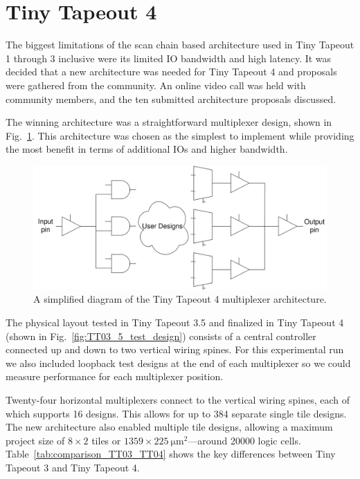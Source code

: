 \section{Tiny Tapeout 4}
\label{sec:tinytapeout4}

The biggest limitations of the scan chain based architecture used in Tiny Tapeout 1 through 3 inclusive were its limited IO bandwidth and high latency.
It was decided that a new architecture was needed for Tiny Tapeout 4 and proposals were gathered from the community.
An online video call was held with community members, and the ten submitted architecture proposals discussed.

The winning architecture was a straightforward multiplexer design, shown in Fig.~\ref{fig:multiplexer_design}. This architecture was chosen as the simplest to implement while providing the most benefit in terms of additional IOs and higher bandwidth.

\begin{figure}[!t]
\centering
\includegraphics[width=\columnwidth]{./Figs/mux architecture.png}
\caption{A simplified diagram of the Tiny Tapeout 4 multiplexer architecture.}
\label{fig:multiplexer_design}
\end{figure}

The physical layout tested in Tiny Tapeout 3.5 and finalized in Tiny Tapeout 4 (shown in Fig.~\ref{fig:TT03_5_test_design}) consists of a central controller connected up and down to two vertical wiring spines.
For this experimental run we also included loopback test designs at the end of each multiplexer so we could measure performance for each multiplexer position.

Twenty-four horizontal multiplexers connect to the vertical wiring spines, each of which supports 16 designs.
This allows for up to 384 separate single tile designs.
The new architecture also enabled multiple tile designs, allowing a maximum project size of $8 \times 2$ tiles or $1359 \times \qty{225}{\um\squared}$---around \num{20000} logic cells. Table~\ref{tab:comparison_TT03_TT04} shows the key differences between Tiny Tapeout 3 and Tiny Tapeout 4.

